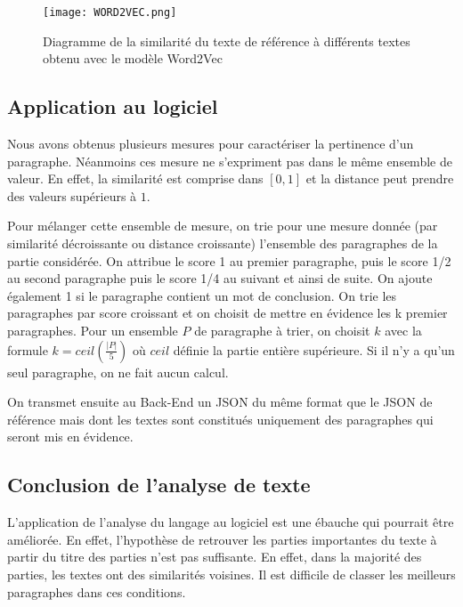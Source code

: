 \documentclass[12pt]{article}
\begin{document}
\begin{figure}
    \centering
    \label{Word2Vec}
    \texttt{[image: WORD2VEC.png]}
    \caption{Diagramme de la similarité du texte de référence à différents textes obtenu avec le modèle Word2Vec}
    \label{mod+}
\end{figure}



\subsection{Application au logiciel}
\noindent
Nous avons obtenus plusieurs mesures pour caractériser la pertinence d'un paragraphe. Néanmoins ces mesure ne s'expriment pas dans le même ensemble de valeur. En effet, la similarité est comprise dans $[0,1]$ et la distance peut prendre des valeurs supérieurs à $1$. 

\noindent
Pour mélanger cette ensemble de mesure, on trie pour une mesure donnée (par similarité décroissante ou distance croissante) l'ensemble des paragraphes de la partie considérée. On attribue le score 1 au premier paragraphe, puis le score 1/2 au second paragraphe puis le score 1/4 au suivant et ainsi de suite. On ajoute également 1 si le paragraphe contient un mot de conclusion.
On trie les paragraphes par score croissant et on choisit de mettre en évidence les k premier paragraphes. Pour un ensemble $P$ de paragraphe à trier, on choisit $k$ avec la formule $k = ceil(\frac{|P|}{5})$ où $ceil$ définie la partie entière supérieure. Si il n'y a qu'un seul paragraphe, on ne fait aucun calcul.

\noindent
On transmet ensuite au Back-End un JSON du même format que le JSON  de référence mais dont les textes sont constitués uniquement des paragraphes qui seront mis en évidence.

\subsection{Conclusion de l'analyse de texte}
\noindent
L'application de l'analyse du langage au logiciel est une ébauche qui pourrait être améliorée. En effet, l'hypothèse de retrouver les parties importantes du texte à partir du titre des parties n'est pas suffisante. En effet, dans la majorité des parties, les textes ont des similarités voisines. Il est difficile de classer les meilleurs paragraphes dans ces conditions.
\end{document}
